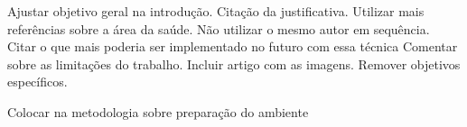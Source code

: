 Ajustar objetivo geral na introdução.
Citação da justificativa.
Utilizar mais referências sobre a área da saúde.
Não utilizar o mesmo autor em sequência.
Citar o que mais poderia ser implementado no futuro com essa técnica
Comentar sobre as limitações do trabalho.
Incluir artigo com as imagens.
Remover objetivos específicos.

Colocar na metodologia sobre preparação do ambiente

